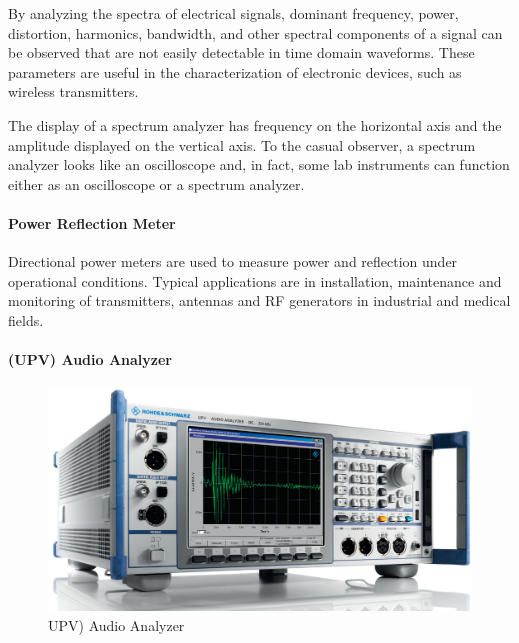 	By analyzing the spectra of electrical signals, dominant frequency, power, distortion, harmonics, bandwidth, and other spectral components of a signal can be observed that are not easily detectable in time domain waveforms. These parameters are useful in the characterization of electronic devices, such as wireless transmitters.

	The display of a spectrum analyzer has frequency on the horizontal axis and the amplitude displayed on the vertical axis. To the casual observer, a spectrum analyzer looks like an oscilloscope and, in fact, some lab instruments can function either as an oscilloscope or a spectrum analyzer.

	
\paragraph*{Power Reflection Meter}
	
	Directional power meters are used to
measure power and reflection under
operational conditions. Typical applications
are in installation, maintenance and
monitoring of transmitters, antennas and
RF generators in industrial and medical
fields. 

\paragraph*{(UPV) Audio Analyzer}

\begin{figure}[H]
	\center
	\setlength{\unitlength}{\textwidth} 
	\includegraphics[width=1.0\unitlength]{audany}
	\caption{\label{fig:audany}UPV) Audio Analyzer}
\end{figure}

